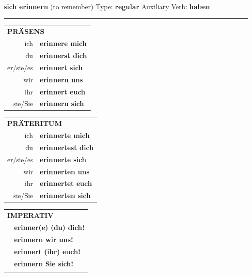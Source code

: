 \documentclass[10pt,a4paper]{revtex4-2}
\begin{document}
\begin{verbbox}
        {\Large \bf sich erinnern} (to remember) \hfill Type: \textbf{regular} \hfill Auxiliary Verb: \textbf{haben} 
    
       \vspace{5pt}

    \hrule
    
    \vspace{5pt}

  \begin{tabular}{rl}
     \multicolumn{2}{l}{\textbf{PRÄSENS} }\\
    ich & \textbf{erinnere mich}\\
    du & \textbf{erinnerst dich}\\
    er/sie/es & \textbf{erinnert sich}\\
    wir & \textbf{erinnern uns}\\
    ihr & \textbf{erinnert euch}\\
    sie/Sie & \textbf{erinnern sich}\\
  \end{tabular}
  \hfill
     \begin{tabular}{rl}
    \multicolumn{2}{l}{\textbf{PRÄTERITUM} }\\
    ich & \textbf{erinnerte mich}\\
    du & \textbf{erinnertest dich}\\
    er/sie/es & \textbf{erinnerte sich}\\
    wir & \textbf{erinnerten uns}\\
    ihr & \textbf{erinnertet euch}\\
    sie/Sie & \textbf{erinnerten sich}\\
  \end{tabular}
  \hfill
  \begin{tabular}{rl}
     \multicolumn{2}{l}{\textbf{IMPERATIV} }\\
   & \textbf{erinner(e) (du) dich!}\\
   & \textbf{erinnern wir uns!}\\
   & \textbf{erinnert (ihr) euch!}\\
   & \textbf{erinnern Sie sich!}\\
   & \vspace{10pt}
  \end{tabular}

    \vspace{10pt}


\end{verbbox}
\end{document}
